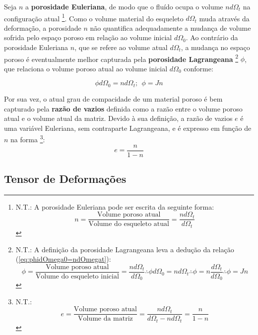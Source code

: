 \documentclass[
	11pt, %
	fleqn, %
	a4paper, %
]{LegrandOrangeBook}
\begin{document}
Seja $n$ a \textbf{porosidade Euleriana}, de modo que o fluído ocupa o volume $nd\Omega_t$ na configuração atual \footnote{N.T.: A porosidade Euleriana pode ser escrita da seguinte forma:
		\begin{displaymath}
		n = \dfrac{\text{Volume poroso atual}}{\text{Volume do esqueleto atual}} = \dfrac{nd\Omega_t}{d\Omega_t} 
		\end{displaymath}}. Como o volume material do esqueleto $d\Omega_t$ muda através da deformação, a porosidade $n$ não quantifica adequadamente a mudança de volume sofrida pelo espaço poroso em relação ao volume inicial $d\Omega_0$. Ao contrário da porosidade Euleriana $n$, que se refere ao volume atual $d\Omega_t$, a mudança no espaço poroso é eventualmente melhor capturada pela \textbf{porosidade Lagrangeana} \footnote{N.T.:
	A definição da porosidade Lagrangeana leva a dedução da relação (\ref{eq:phidOmega0=ndOmegat}):
	\begin{displaymath}		
		\phi = \dfrac{\text{Volume poroso atual}}{\text{Volume do esqueleto inicial}} = \dfrac{nd\Omega_t}{d\Omega_0} \therefore \phi d\Omega_0 = n d\Omega_t \therefore \phi = n \dfrac{d\Omega_t}{d\Omega_0} \therefore \phi = Jn
	\end{displaymath}
} $\phi$, que relaciona o volume poroso atual ao volume inicial $d\Omega_0$ conforme:

\begin{equation}
	\label{eq:phidOmega0=ndOmegat}	
\phi d\Omega_0 = n d\Omega_t; ~~\phi = Jn
\end{equation}

Por sua vez, o atual grau de compacidade de um material poroso é bem capturado pela \textbf{razão de vazios} definida como a razão entre o volume poroso atual e o volume atual da matriz. Devido à sua definição, a razão de vazios $e$ é uma variável Euleriana, sem contraparte Lagrangeana, e é expresso em função de $n$ na forma \footnote{N.T.:				
	\begin{displaymath}	
		e = \dfrac{\text{Volume poroso atual}}{\text{Volume da matriz}} = \dfrac{nd\Omega_t}{d\Omega_t-nd\Omega_t} = \dfrac{n}{1-n}
	\end{displaymath}}:
\begin{equation}
	\label{eq:e}	
	e = \dfrac{n}{1-n}
\end{equation}

\subsection{Tensor de Deformações}
\end{document}
